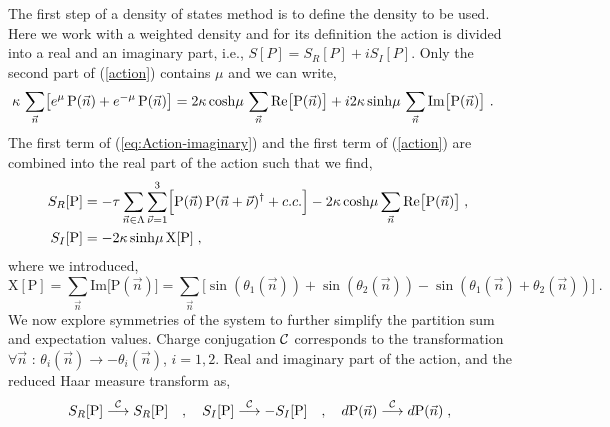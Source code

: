 \documentclass[a4paper,11pt]{article}
\begin{document}
The first step of a density of states method is to define the density to be used. Here we work with 
a weighted density and for 
its definition the action is divided into a real and an imaginary part, i.e., $S[P]=S_R[P]+iS_I[P]$. 
Only the second part of (\ref{action}) 
contains $\mu$ and we can write,
%
\begin{equation}
\label{eq:Action-imaginary}
\hspace*{-0.35cm}
\kappa \, \sum_{\vec{n}} \bigl[ e^{\mu} \, \mathrm{P}(\vec{n})  + e^{-\mu} \, \mathrm{P}(\vec{n}) \bigr] = 
2 \kappa \cosh\!  \mu \, \sum_{\vec{n}} \mathrm{Re} \bigl[ \mathrm{P}(\vec{n}) \bigr]  + 
i 2 \kappa \sinh \! \mu \, \sum_{\vec{n}} \mathrm{Im} \bigl[ \mathrm{P} (\vec{n}) \bigr] ~ .
\end{equation}
%
The first term of (\ref{eq:Action-imaginary}) and the first term of (\ref{action})
are combined into the real part of the action such that we find,
%
\begin{equation}
\begin{split}
S_R[\mathrm{P}] & = - \tau \sum\limits_{\vec{n} \in \Lambda} \sum\limits_{\vec{\nu}=1}^3 
\Bigl[ \mathrm{P}(\vec{n}) \, \mathrm{P}(\vec{n}+\vec{\nu})^{\dagger} + c.c. \Bigr] - 
2 \kappa \cosh \! \mu  \sum_{\vec{n}} \mathrm{Re} \bigl[ \mathrm{P}(\vec{n}) \bigr] \; , \; \\
S_I[\mathrm{P}] & = - 2 \kappa \sinh \! \mu \,  \mathrm{X[P]}  \; ,
\end{split}
\end{equation}
%
where we introduced,
\begin{equation}
\mathrm{X}[\mathrm{P}] = \sum_{\vec{n}} \mathrm{Im} \bigl[ \mathrm{P} (\vec{n}) \bigr] = \sum_{\vec{n}} \bigl[ \sin( \theta_1(\vec{n}) ) +  \sin( \theta_2(\vec{n}) ) -  \sin( \theta_1(\vec{n}) + \theta_2(\vec{n}) ) \bigr] ~.
\end{equation}
%
We now explore symmetries of the system to further simplify the partition sum and expectation values.
Charge conjugation ${\cal C}$ corresponds to the transformation $\forall \vec{n}$ :
$\theta_i(\vec{n}) \rightarrow - \theta_i(\vec{n})$, $i = 1,2$. 
Real and imaginary part of the action, and the reduced Haar measure transform as,
%
\begin{equation}
S_{R}[\mathrm{P}]  \overset{{\cal C}}{\longrightarrow} S_{R}[\mathrm{P}] \quad , \quad 
S_I[\mathrm{P}]  \overset{{\cal C}}{\longrightarrow} -S_I[\mathrm{P}] \quad , \quad 
d \mathrm{P}(\vec{n})  \overset{{\cal C}}{\longrightarrow} d \mathrm{P}(\vec{n}) \; ,
\end{equation}
\end{document}
